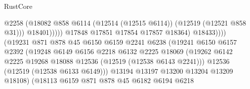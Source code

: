 \begin{lexlean}{RustCore}
\begin{coremodule}
                                                    @2258
                                                    (@18082
                                                      @858
                                                      @6114
                                                      (@12514 (@12515 @6114))
                                                      (@12519 (@12521 @858 @31)))
                                                    @18401)))))
                                          @17848
                                          @17851
                                          @17854
                                          @17857
                                          @18364)
                                        @18433))))
                                (@19231
                                  @871
                                  @878
                                  @45
                                  @6150
                                  @6159
                                  @2241
                                  @6238
                                  (@19241
                                    @6150
                                    @6157
                                    @2392
                                    (@19248
                                      @6149
                                      @6156
                                      @2218
                                      @6132
                                      @2225
                                      @18069
                                      (@19262
                                        @6142
                                        @2225
                                        @19268
                                        @18088
                                        @12536
                                        (@12519 (@12538 @6143 @2241)))
                                      @12536
                                      (@12519 (@12538 @6133 @6149)))
                                    @13194
                                    @13197
                                    @13200
                                    @13204
                                    @13209
                                    @18108)
                                  (@18113
                                    @6159
                                    @871
                                    @878
                                    @45
                                    @6182
                                    @6194
                                    @6218

\end{coremodule}
\end{lexlean}

